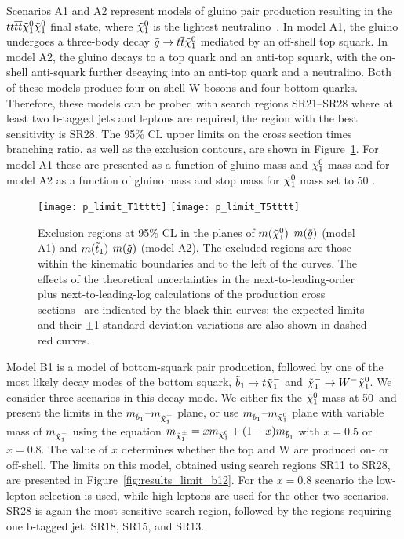 \clearpage
Scenarios A1 and A2 represent models of gluino pair production resulting in the
$\relax{t} \relax{t} \overline{\relax{t}} \overline{\relax{t}} \tilde{\chi}^{0}_1 \tilde{\chi}^{0}_1$ final state, where $\tilde{\chi}^{0}_1$ is the
lightest neutralino~\cite{stopVirtual,stopVirtualPRD,sms,wacker,naturalness4}.
In model A1, the gluino undergoes a three-body decay $\tilde{\relax{g}} \to \relax{t}\overline{\relax{t}} \tilde{\chi}^{0}_1$
mediated by an off-shell top squark. In model A2, the gluino decays to a top
quark and an anti-top squark, with the on-shell anti-squark further decaying
into an anti-top quark and a neutralino. Both of these models produce four
on-shell W bosons and four bottom quarks. Therefore, these models can be probed with
search regions SR21--SR28 where at least two b-tagged jets and \hpt leptons
are required, the region with the best sensitivity is SR28. The 95\% CL upper
limits on the cross section times branching ratio, as well as the exclusion
contours, are shown in Figure~\ref{fig:results_limit_a12}. For model A1 these
are presented as a function of gluino mass and $\tilde{\chi}^{0}_1$ mass and for model
A2 as a function of gluino mass and stop mass for $\tilde{\chi}^{0}_1$ mass set to 50
\GeV.
\begin{figure}[!tbh]
\begin{center}
\texttt{[image: p\_limit\_T1tttt]}
\texttt{[image: p\_limit\_T5tttt]}
\caption[Exclusion curves for models A1 and A2]
{\label{fig:results_limit_a12}
Exclusion regions at 95\% CL in the planes of $m(\tilde{\chi}^{0}_1)$ \vs $m(\tilde{\relax{g}})$
(model A1) and $m(\tilde{\relax{t}}_1)$ \vs $m(\tilde{\relax{g}})$ (model A2). The excluded
regions are those within the kinematic boundaries and to the left
of the curves. The effects of the theoretical uncertainties in the
next-to-leading-order plus next-to-leading-log calculations of the production
cross sections~\cite{kramer_2012bx} are indicated by the black-thin curves; the
expected limits and their $\pm$1 standard-deviation variations are also shown
in dashed red curves.
}
\end{center}
\end{figure}
\clearpage

Model B1 is a model of bottom-squark pair production, followed by one of the
most likely decay modes of the bottom squark, $\tilde{\relax{b}}_1 \to \relax{t} \tilde{\chi}^{-}_1$
and $\tilde{\chi}^{-}_1 \to {\relax{W^-}} \tilde{\chi}^{0}_1$. We consider three scenarios in this decay
mode. We either fix the $\tilde{\chi}^{0}_1$ mass at 50~\GeV and present the limits in
the $m_{\tilde{\relax{b}}_1}$--$m_{\tilde{\chi}^{\pm}_1}$ plane, or use $m_{\tilde{\relax{b}}_1}$--$m_{\tilde{\chi}^{0}_1}$
plane with variable mass of $m_{\tilde{\chi}^{\pm}_1}$ using the equation $m_{\tilde{\chi}^{\pm}_1} 
=  xm_{\tilde{\chi}^{0}_1}  +  (1-x)m_{\tilde{\relax{b}}_1}$ with $x=0.5$ or $x=0.8$. The value of
$x$ determines whether the top and W are produced on- or off-shell. The limits
on this model, obtained using search regions SR11 to SR28, are presented in
Figure~\ref{fig:results_limit_b12}. For the $x=0.8$ scenario the low-\pt lepton selection
is used, while high-\pt leptons are used for the other two scenarios. SR28 is
again the most sensitive search region, followed by the regions requiring one
b-tagged jet: SR18, SR15, and SR13.

